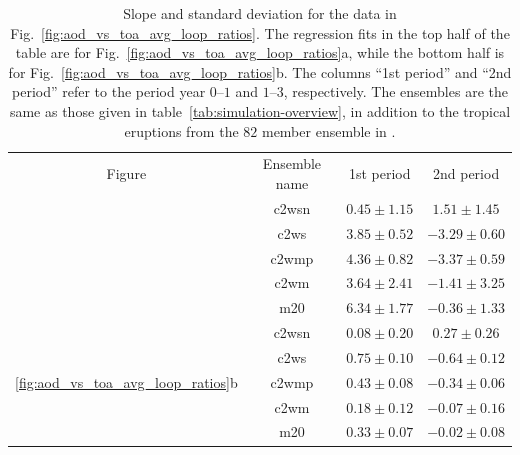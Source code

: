 \documentclass{ametsocV6.1}
\begin{document}
\begin{table}
  \centering

  \caption{Slope and standard deviation for the data in
    Fig.~\ref{fig:aod_vs_toa_avg_loop_ratios}. The regression fits in the top half of the
    table are for Fig.~\ref{fig:aod_vs_toa_avg_loop_ratios}a, while the bottom half is for
    Fig.~\ref{fig:aod_vs_toa_avg_loop_ratios}b. The columns ``1st period'' and ``2nd
    period'' refer to the period year \(0\)--\(1\) and \(1\)--\(3\), respectively. The
    ensembles are the same as those given in table~\ref{tab:simulation-overview}, in
    addition to the tropical eruptions from the \(82\) member ensemble in
    \citet{marshall2020}.}\label{tab:slope-gradients}%
  \begin{tabular}{cccc}
    Figure                                                  & Ensemble name & 1st period      & 2nd period       \\
    \rowcolor{LightGray}                                    & \gls{c2wsn}   & \(0.45\pm1.15\) & \(1.51\pm1.45\)  \\
    \rowcolor{LightGray}                                    & \gls{c2ws}    & \(3.85\pm0.52\) & \(-3.29\pm0.60\) \\
    \rowcolor{LightGray}                                    & \gls{c2wmp}   & \(4.36\pm0.82\) & \(-3.37\pm0.59\) \\
    \rowcolor{LightGray}                                    & \gls{c2wm}    & \(3.64\pm2.41\) & \(-1.41\pm3.25\) \\
    \rowcolor{LightGray}                                    & \gls{m20}     & \(6.34\pm1.77\) & \(-0.36\pm1.33\) \\
    \multirow{5}{*}{\ref{fig:aod_vs_toa_avg_loop_ratios}b}  & \gls{c2wsn}   & \(0.08\pm0.20\) & \(0.27\pm0.26\)  \\
    \multirow{-9}{*}{\ref{fig:aod_vs_toa_avg_loop_ratios}a} & \gls{c2ws}    & \(0.75\pm0.10\) & \(-0.64\pm0.12\) \\
                                                            & \gls{c2wmp}   & \(0.43\pm0.08\) & \(-0.34\pm0.06\) \\
                                                            & \gls{c2wm}    & \(0.18\pm0.12\) & \(-0.07\pm0.16\) \\
                                                            & \gls{m20}     & \(0.33\pm0.07\) & \(-0.02\pm0.08\) \\
  \end{tabular}
\end{table}
\end{document}
